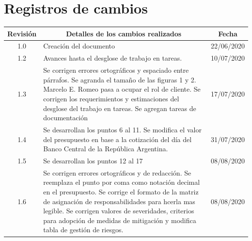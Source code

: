 \documentclass[11pt]{charter}
\begin{document}
\maketitle
\thispagestyle{empty}
\pagebreak


\thispagestyle{empty}
{\setlength{\parskip}{0pt}
\tableofcontents{}
}
\pagebreak


\section{Registros de cambios}
\label{sec:registro}


\begin{table}[ht]
\label{tab:registro}
\centering

\begin{tabularx}{\linewidth}{@{}|c|X|c|@{}}
\hline
\rowcolor[HTML]{C0C0C0} 
Revisión & \multicolumn{1}{c|}{\cellcolor[HTML]{C0C0C0}Detalles de los cambios realizados} & Fecha      \\ \hline
1.0      & Creación del documento                                                          & 22/06/2020 \\ \hline
1.2      & Avances hasta el desglose de trabajo en tareas.                                 & 10/07/2020 \\ \hline
1.3      & Se corrigen errores ortográficos y espaciado entre párrafos. \newline
	Se agranda el tamaño de las figuras 1 y 2.\newline
	Marcelo E. Romeo pasa a ocupar el rol de cliente.\newline
	Se corrigen los requerimientos y estimaciones del desglose del trabajo en tareas.\newline
	Se agregan tareas de documentación
& 17/07/2020 \\ \hline

1.4      & Se desarrollan los puntos 6 al 11.\newline
	Se modifica el valor del presupuesto en base a la cotización del día del Banco Central de la República Argentina.\newline
& 31/07/2020 \\ \hline
1.5      & Se desarrollan los puntos 12 al 17                                                  & 08/08/2020 \\ \hline
1.6      & Se corrigen errores ortográficos y de redacción. \newline
	Se reemplaza el punto por coma como notación decimal en el presupuesto.\newline
	Se corrige el formato de la matriz de asignación de responsabilidades para hcerla mas legible.\newline
	Se corrigen valores de severidades, criterios para adopción de medidas de mitigación y modifica tabla de gestión de riesgos.& 08/08/2020 \\ \hline
\end{tabularx}
\end{table}
\end{document}
